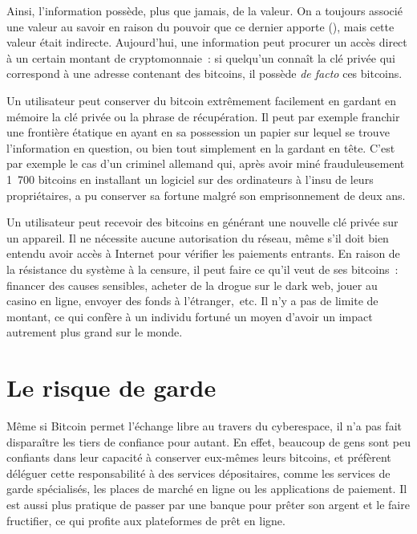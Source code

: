 Ainsi, l'information possède, plus que jamais, de la valeur. On a toujours associé une valeur au savoir en raison du pouvoir que ce dernier apporte (), mais cette valeur était indirecte. Aujourd'hui, une information peut procurer un accès direct à un certain montant de cryptomonnaie~: si quelqu'un connaît la clé privée qui correspond à une adresse contenant des bitcoins, il possède \emph{de facto} ces bitcoins.

Un utilisateur peut conserver du bitcoin extrêmement facilement en gardant en mémoire la clé privée ou la phrase de récupération. Il peut par exemple franchir une frontière étatique en ayant en sa possession un papier sur lequel se trouve l'information en question, ou bien tout simplement en la gardant en tête. C'est par exemple le cas d'un criminel allemand qui, après avoir miné frauduleusement 1~700 bitcoins en installant un logiciel sur des ordinateurs à l'insu de leurs propriétaires, a pu conserver sa fortune malgré son emprisonnement de deux ans.

Un utilisateur peut recevoir des bitcoins en générant une nouvelle clé privée sur un appareil. Il ne nécessite aucune autorisation du réseau, même s'il doit bien entendu avoir accès à Internet pour vérifier les paiements entrants. En raison de la résistance du système à la censure, il peut faire ce qu'il veut de ses bitcoins~: financer des causes sensibles, acheter de la drogue sur le dark web, jouer au casino en ligne, envoyer des fonds à l'étranger,~etc. Il n'y a pas de limite de montant, ce qui confère à un individu fortuné un moyen d'avoir un impact autrement plus grand sur le monde.

\section*{Le risque de garde}

Même si Bitcoin permet l'échange libre au travers du cyberespace, il n'a pas fait disparaître les tiers de confiance pour autant. En effet, beaucoup de gens sont peu confiants dans leur capacité à conserver eux-mêmes leurs bitcoins, et préfèrent déléguer cette responsabilité à des services dépositaires, comme les services de garde spécialisés, les places de marché en ligne ou les applications de paiement. Il est aussi plus pratique de passer par une banque pour prêter son argent et le faire fructifier, ce qui profite aux plateformes de prêt en ligne.

